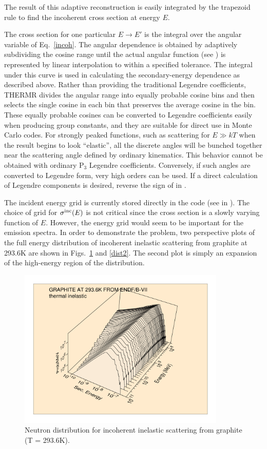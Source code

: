 The result of this adaptive reconstruction is easily integrated by the
trapezoid rule to find the incoherent cross section at energy $E$.

The cross section for one particular $E{\rightarrow}E'$ is the integral
over the angular variable of Eq.~\ref{incoh}.  The angular dependence
is obtained by adaptively subdividing the cosine range until the actual
angular function (see ) is represented
by linear interpolation to within a specified tolerance.  The integral
under this curve is used in calculating the secondary-energy dependence
as described above.  Rather than providing the traditional Legendre
coefficients, THERMR divides the angular range into equally probable
cosine bins and then selects the single cosine in each bin that
preserves the average cosine in the bin.  These equally probable
cosines can be converted to Legendre coefficients easily
when producing group constants, and they are suitable for direct use in
Monte Carlo codes.  For strongly peaked functions, such as scattering for
$E{\gg}kT$ when the result begins to look ``elastic'', all the discrete
angles will be bunched together near the scattering angle defined by
ordinary kinematics.  This behavior cannot be obtained with ordinary
P$_3$ Legendre coefficients.  Conversely, if such angles are converted to
Legendre form, very high orders can be used.  If a direct calculation of
Legendre components is desired, reverse the sign of  in
.

The incident energy grid is currently stored
directly in the code (see  in ).  The choice
of grid for $\sigma^{\rm inc}(E)$ is not critical since the cross section
is a slowly varying function of $E$.  However, the energy grid
would seem to be important for the emission spectra.  In order
to demonstrate the problem, two perspective plots of
the full energy distribution of incoherent inelastic scattering from
graphite at 293.6K are shown in Figs.~\ref{dist} and \ref{dist2}.
The second plot is simply an expansion of the high-energy region
of the distribution.

\begin{figure}[thb]\centering
\includegraphics[keepaspectratio,height=3.0in, angle=0]{figs/thermr3ack}
\caption[Neutron distribution for incoherent inelastic scattering from graphite
 (T = 293.6K)]{Neutron distribution for incoherent inelastic scattering from
 graphite (T = 293.6K).}
\label{dist}
\end{figure}

